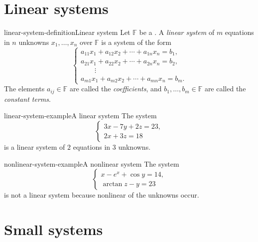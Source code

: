 \documentclass[preview]{standalone}
\begin{document}
\genpage

\section{Linear systems}

\begin{snippetdefinition}{linear-system-definition}{Linear system}
    Let \(\mathbb{F}\) be a \field. A \emph{linear system} of \(m\)
    equations in \(n\) unknowns \(x_1,\ldots,x_n\) over \(\mathbb{F}\) is a
    system of the form
    \[
        \begin{cases}
            a_{11}x_1+a_{12}x_2+\cdots+a_{1n}x_n=b_1,\\
            a_{21}x_1+a_{22}x_2+\cdots+a_{2n}x_n=b_2,\\
            \qquad\vdots\\
            a_{m1}x_1+a_{m2}x_2+\cdots+a_{mn}x_n=b_m.
        \end{cases}
    \]
    The elements \(a_{ij}\in\mathbb{F}\) are called the
    \emph{coefficients}, and \(b_1,\ldots,b_m\in\mathbb{F}\) are called the
    \emph{constant terms}.
\end{snippetdefinition}

\begin{snippetexample}{linear-system-example}{A linear system}
    The system
    \[
        \begin{cases}
            3x-7y+2z=23,\\
            2x+3z=18
        \end{cases}
    \]
    is a linear system of \(2\) equations in \(3\) unknowns.
\end{snippetexample}

\begin{snippetexample}{nonlinear-system-example}{A nonlinear system}
    The system
    \[
        \begin{cases}
            x-e^x+\cos y=14,\\
            \arctan z-y=23
        \end{cases}
    \]
    is not a linear system because nonlinear \function[functions] of the unknowns occur.
\end{snippetexample}

\section{Small systems}
\end{document}
